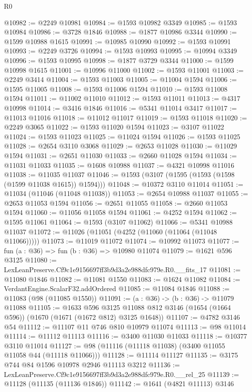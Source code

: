 \begin{lexlean}{R0}
\begin{coremodule}
@10982 := @2249 @10981
@10984 := @1593 @10982 @3349
@10985 := @1593 @10984
@10986 := @3728 @1846
@10988 := @1877 @10986 @3344
@10990 := @1599 @10988 @1615
@10991 := @10985 @10990
@10992 := @1593 @10991
@10993 := @2249 @3726
@10994 := @1593 @10993
@10995 := @10994 @3349
@10996 := @1593 @10995
@10998 := @1877 @3729 @3344
@11000 := @1599 @10998 @1615
@11001 := @10996 @11000
@11002 := @1593 @11001
@11003 := @2249 @3414
@11004 := @1593 @11003
@11005 := @11004 @1594
@11006 := @1595 @11005
@11008 := @1593 @11006 @1594
@11010 := @1593 @11008 @1594
@11011 := @11002 @11010
@11012 := @1593 @11011
@11013 := @4317 @10998
@11014 := @3416 @1846
@11016 := @5341 @11014 @3417
@11017 := @11013 @11016
@11018 := @11012 @11017
@11019 := @1593 @11018
@11020 := @2249 @3065
@11022 := @1593 @11020 @1594
@11023 := @3107 @11022
@11024 := @1593 @11023
@11025 := @11024 @1594
@11026 := @1593 @11025
@11028 := @2654 @3110 @3068
@11029 := @2653 @11028
@11030 := @11029 @1594
@11031 := @2651 @11030
@11033 := @2660 @11028 @1594
@11034 := @11031 @11033
@11035 := @1608 @10988
@11037 := @4321 @10998 @11016
@11038 := @11035 @11037
@11046 := @1593 (@3107 (@1595 (@1593 (@1598 (@1599 @11038 @1615)) @1594)))
@11048 := @10372 @3110 @11014
@11051 := @11034 (@11046 (@11048 @11038))
@11053 := @2654 @10988 @11037
@11055 := @2653 @11053 @1594
@11056 := @2651 @11055
@11058 := @2660 @11053 @1594
@11060 := @11056 @11058 @1594
@11061 := @4252 @1594
@11062 := @1595 @11061
@11064 := @1593 (@3107 @11062)
@11066 := @5341 @10988 @11037
@11072 := @11026 (@11051 (@4252 (@11060 (@11064 (@11048 @11066)))))
@11073 := @11019 @11072
@11074 := @10992 @11073
@11077 := fun (a : @36) => fun (b : @36) => @10980 @11074
@11079 := @1621 @596 @3125
@11080 := LexLeanPreserve.Cf9c1e9156697ff3b9d3a2e988dfc979e.R0.__fits_17
@11081 := @11080 @1846
@11082 := @11081 @1550
@11083 := @1624 @11082
@11084 := VerdantEngine.ScalarF32.addOrdered
@11085 := @11084 @1846
@11088 := @11083 (@98 (@11085 @1550))
@11091 := (a : @36) -> (b : @36) -> @11079 @11088
@11105 := @1633
    @596
    @3125
    @11088
    @812
    @3146
    (@1654 (@1664 @596))
    (@1670 (@1671 (@1672 @812) @3125 @1648))
@11107 := @4782 @3146 @54
@11112 := @11107 @11 @746 @810 @10979 @11074
@11113 := @98 @11014
@11114 := @11112 @11113
@11116 := @3400 @11030 @11033
@11118 := @10377 @3110 @11014
@11127 := @98 (@11116 (@11118 @11038) (@3400 @11055 @11058 @44 (@11118 @11066)))
@11128 := @11114 @11127
@11135 := @3175 @744 @84 @1596 @10978 @2946 @11113 @3212
@11136 := LexLeanPreserve.Cf9c1e9156697ff3b9d3a2e988dfc979e.R0.__rel_25
@11139 := @11128 (@11135 (@11136 @1846))
@11142 := @1641 (@4821 @11113) @3146

\end{coremodule}
\end{lexlean}
